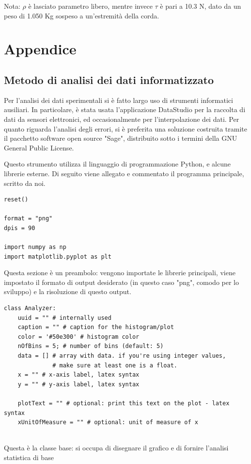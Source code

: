 \documentclass[a4paper,10pt]{report}
\begin{document}
Nota: $\rho$ è lasciato parametro libero, mentre invece $\tau$ è pari a 10.3 N, dato da un peso di 1.050 Kg sospeso a un'estremità della corda.

\chapter*{Appendice}
\section*{Metodo di analisi dei dati informatizzato}
Per l'analisi dei dati sperimentali si è fatto largo uso di strumenti informatici ausiliari.
In particolare, è stata usata l'applicazione DataStudio per la raccolta di dati da sensori elettronici, ed occasionalmente per l'interpolazione dei dati.
Per quanto riguarda l'analisi degli errori, si è preferita una soluzione costruita tramite il pacchetto software open source "Sage", distribuito sotto i termini della GNU General Public License.

Questo strumento utilizza il linguaggio di programmazione Python, e alcune librerie esterne. Di seguito viene allegato e commentato il programma principale, scritto da noi.

\begin{lstlisting}
reset()

format = "png"
dpis = 90

import numpy as np
import matplotlib.pyplot as plt
\end{lstlisting}

Questa sezione è un preambolo: vengono importate le librerie principali, viene impostato il formato di output desiderato (in questo caso "png", comodo per lo sviluppo) e la risoluzione di questo output.

\begin{lstlisting}
class Analyzer:
    uuid = "" # internally used
    caption = "" # caption for the histogram/plot
    color = '#50e300' # histogram color
    nOfBins = 5; # number of bins (default: 5)
    data = [] # array with data. if you're using integer values,
    		  # make sure at least one is a float.
    x = "" # x-axis label, latex syntax
    y = "" # y-axis label, latex syntax
    
    plotText = "" # optional: print this text on the plot - latex syntax
    xUnitOfMeasure = "" # optional: unit of measure of x
    
\end{lstlisting}

Questa è la classe base: si occupa di disegnare il grafico e di fornire l'analisi statistica di base
\end{document}
